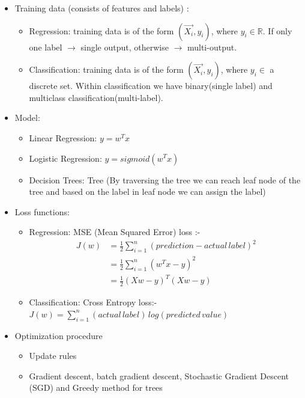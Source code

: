 \documentclass[11pt, twosides]{article}
\begin{document}
\begin{itemize}
    \item Training data (consists of features and labels) :
    \begin{itemize}
        \item Regression: training data is of the form $\left(\Vec{X_i}, y_i \right)$, where $y_i \in \mathbb{R}$. If only one label $\rightarrow$ single output, otherwise $\rightarrow$ multi-output.
        \item Classification: training data is of the form $\left(\Vec{X_i}, y_i \right)$, where $y_i \in$ a discrete set. Within classification we have binary(single label) and multiclass classification(multi-label).
    \end{itemize}
    
    \item Model:
    \begin{itemize}
        \item Linear Regression: $y=w^T x$
        \item Logistic Regression: $y=sigmoid(w^T x)$
        \item Decision Trees: Tree (By traversing the tree we can reach leaf node of the tree and based on the label in leaf node we can assign the label)
    \end{itemize}
    
    \item Loss functions:
    \begin{itemize}
        \item Regression: MSE (Mean Squared Error) loss :- \begin{equation*}\begin{split}J(w)&=\frac{1}{2}\sum_{i=1}^{n}(prediction - actual\,label)^2\\
        &=\frac{1}{2}\sum_{i=1}^{n}(w^T x - y)^2\\
        &=\frac{1}{2}(Xw - y)^T(Xw - y)\end{split}\end{equation*}
        \item Classification:  Cross Entropy loss:- $J(w)=\sum_{i=1}^{n}(actual\,label)\, log(predicted \,value)$
    \end{itemize}
    
    \item Optimization procedure
    \begin{itemize}
        \item Update rules
        \item Gradient descent, batch gradient descent, Stochastic Gradient Descent (SGD) and Greedy method for trees


\end{itemize}
\end{itemize}
\end{document}
